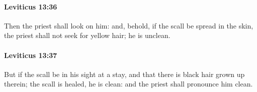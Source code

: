 		\paragraph{Leviticus 13:36} %
			\label{LEVITICUS-13-36}

			Then the priest shall look on him: and, behold, if the scall be spread in the skin, the priest shall not seek for yellow hair; he is unclean.


		\paragraph{Leviticus 13:37} %
			\label{LEVITICUS-13-37}

			But if the scall be in his sight at a stay, and that there is black hair grown up therein; the scall is healed, he is clean: and the priest shall pronounce him clean.


